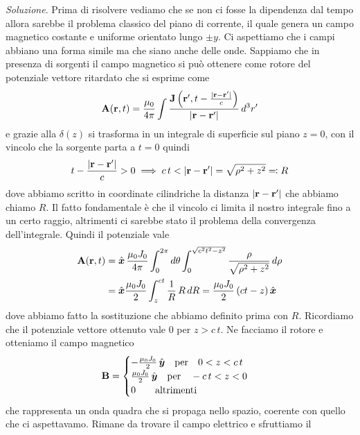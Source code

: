 \textit{Soluzione}. Prima di risolvere vediamo che se non ci fosse la dipendenza dal tempo allora sarebbe il problema classico del piano di corrente, 
il quale genera un campo magnetico costante e uniforme orientato lungo $ \pm y $. Ci aspettiamo che i campi abbiano una forma simile ma che siano anche 
delle onde. Sappiamo che in presenza di sorgenti il campo magnetico si può ottenere come rotore del potenziale vettore ritardato che si esprime come
\begin{align}
  \mathbf{ A }(\mathbf{ r },t) 
  = \frac{\mu_0}{4\pi} \int \frac{\mathbf{ J }\left( \mathbf{ r' }, t - \frac{|\mathbf{ r-r' }|}{c} \right)}{|\mathbf{ r-r' }|} \,d^3r'
\end{align}
e grazie alla $ \delta(z) $ si trasforma in un integrale di superficie sul piano $ z= 0 $, con il vincolo che la sorgente parta a $ t = 0 $ quindi 
\begin{align}
  t - \frac{|\mathbf{ r-r' }|}{c} > 0 \implies c\,t < |\mathbf{ r-r' }| = \sqrt{\rho^2 + z^2} \eqcolon R
\end{align}
dove abbiamo scritto in coordinate cilindriche la distanza $ |\mathbf{ r-r' }| $ che abbiamo chiamo $ R $. Il fatto fondamentale è che il vincolo ci 
limita il nostro integrale fino a un certo raggio, altrimenti ci sarebbe stato il problema della convergenza dell'integrale. Quindi il potenziale vale
\begin{align}
  \mathbf{ A }(\mathbf{ r },t) 
  &= \hat{\boldsymbol{x}}\, \frac{\mu_0 J_0}{4\pi}\int_0^{2\pi} d\theta \int_0^{\sqrt{c^2 t^2 - z^2}}\frac{\rho }{\sqrt{\rho^2 + z^2}} \,d\rho
  \\
  &= \hat{\boldsymbol{x}} \frac{\mu_0J_0}{2} \int_z^{ct} \frac{1}{R}\, R\,dR = \frac{\mu_0 J_0}{2} \left( ct - z \right) \hat{\boldsymbol{x}}
\end{align}
dove abbiamo fatto la sostituzione che abbiamo definito prima con $ R $. Ricordiamo che il potenziale vettore ottenuto vale $ 0 $  per $ z > c\,t $. 
Ne facciamo il rotore e otteniamo il campo magnetico 
\begin{align}
  \mathbf{ B } = 
  \begin{cases}
    - \frac{\mu_0J_0}{2} \, \hat{\boldsymbol{y}} \quad \text{per} \quad 0 < z < c\,t  \\
    \frac{\mu_0J_0}{2} \, \hat{\boldsymbol{y}} \quad \text{per} \quad -c\,t< z < 0 \\
    0 \qquad \text{altrimenti}
  \end{cases}
\end{align}
che rappresenta un onda quadra che si propaga nello spazio, coerente con quello che ci aspettavamo. Rimane da trovare il campo elettrico e sfruttiamo il 
